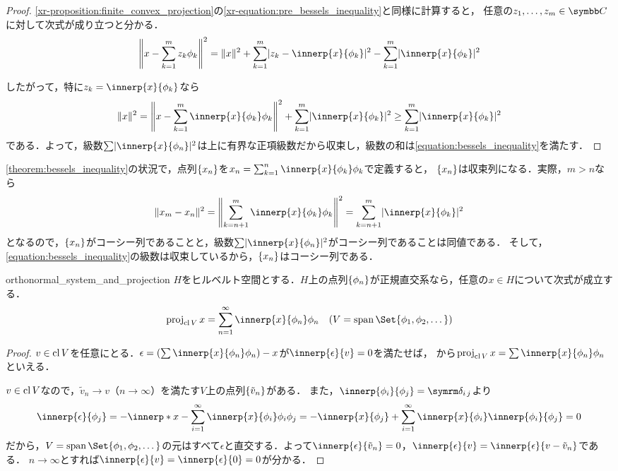 \documentclass[../../main]{subfiles}
\begin{document}
\begin{proof}
  \cref{xr-proposition:finite_convex_projection}の\cref{xr-equation:pre_bessels_inequality}と同様に計算すると，
  任意の\(z_1,\dots,z_m\in\numset{C}\)に対して次式が成り立つと分かる．
  \[
    \vnorm*{x-\sum_{k=1}^mz_k\phi_k}^2 = \vnorm{x}^2+\sum_{k=1}^m\abs{z_k-\innerp{x}{\phi_k}}^2-\sum_{k=1}^m\abs{\innerp{x}{\phi_k}}^2
  \]

  したがって，特に\(z_k=\innerp{x}{\phi_k}\)なら
  \[
    \vnorm{x}^2 = \vnorm*{x-\sum_{k=1}^m\innerp{x}{\phi_k}\phi_k}^2+\sum_{k=1}^m\abs{\innerp{x}{\phi_k}}^2
    \geq \sum_{k=1}^m\abs{\innerp{x}{\phi_k}}^2
  \]
  である．よって，級数\(\sum\abs{\innerp{x}{\phi_n}}^2\)は上に有界な正項級数だから収束し，級数の和は\cref{equation:bessels_inequality}を満たす．
\end{proof}

\cref{theorem:bessels_inequality}の状況で，点列\(\lbrace x_n\rbrace\)を\(x_n=\sum_{k=1}^n\innerp{x}{\phi_k}\phi_k\)で定義すると，
\(\lbrace x_n\rbrace\)は収束列になる．実際，\(m>n\)なら
\[
  \vnorm{x_m-x_n}^2 = \vnorm*{\sum_{k=n+1}^m\innerp{x}{\phi_k}\phi_k}^2
  = \sum_{k=n+1}^m\abs{\innerp{x}{\phi_k}}^2
\]
となるので，\(\lbrace x_n\rbrace\)がコーシー列であることと，級数\(\sum\abs{\innerp{x}{\phi_n}}^2\)がコーシー列であることは同値である．
そして，\cref{equation:bessels_inequality}の級数は収束しているから，\(\lbrace x_n\rbrace\)はコーシー列である．

\begin{proposition}{}{orthonormal_system_and_projection}
  \(H\)をヒルベルト空間とする．\(H\)上の点列\(\lbrace\phi_n\rbrace\)が正規直交系なら，任意の\(x\in H\)について次式が成立する．
  \[
    \proj_{\clsr V}x = \sum_{n=1}^\infty\innerp{x}{\phi_n}\phi_n\quad(V=\spannedby\Set{\phi_1,\phi_2,\dotsc})
  \]
\end{proposition}

\begin{proof}
  \(v\in\operatorname{cl} V\)を任意にとる．\(\epsilon=(\sum\innerp{x}{\phi_n}\phi_n)-x\)が\(\innerp{\epsilon}{v}=0\)を満たせば，
  から\(\proj_{\clsr V}x=\sum\innerp{x}{\phi_n}\phi_n\)といえる．

  \(v\in\operatorname{cl} V\)なので，\(\tilde{v}_n\to v\)（\(n\to\infty\)）を満たす\(V\)上の点列\(\lbrace\tilde{v}_n\rbrace\)がある．
  また，\(\innerp{\phi_i}{\phi_j}=\kdelta{i}{j}\)より
  \[
    \innerp{\epsilon}{\phi_j} = -\innerp*{x-\sum_{i=1}^\infty\innerp{x}{\phi_i}\phi_i}{\phi_j}
    = -\innerp{x}{\phi_j}+\sum_{i=1}^\infty\innerp{x}{\phi_i}\innerp{\phi_i}{\phi_j}
    = 0
  \]
  だから，\(V=\spannedby\Set{\phi_1,\phi_2,\dotsc}\)の元はすべて\(\epsilon\)と直交する．よって\(\innerp{\epsilon}{\tilde{v}_n}=0\)，\(\innerp{\epsilon}{v}=\innerp{\epsilon}{v-\tilde{v}_n}\)である．
  \(n\to\infty\)とすれば\(\innerp{\epsilon}{v}=\innerp{\epsilon}{0}=0\)が分かる．
\end{proof}
\end{document}
